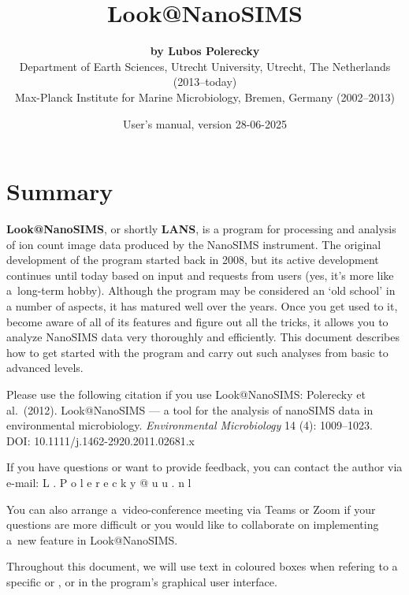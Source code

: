 \documentclass[a4paper, 11pt]{article}
\title{\LARGE \bf Look@NanoSIMS}
\author{{\large\bf by Lubos Polerecky}\\[6mm]
{\small Department of Earth Sciences, Utrecht University, Utrecht, The Netherlands (2013--today)} \\%
{\small Max-Planck Institute for Marine Microbiology, Bremen, Germany (2002--2013)}\\[3mm]}
\date{User's manual, version 28-06-2025}
\newcommand{\ttt}[1]{\textsf{#1}}
\begin{document}
\maketitle
\reversemarginpar 

\section*{Summary}
\textbf{Look@NanoSIMS}, or shortly \textbf{LANS}, is a program for processing and analysis of ion count image data produced by the NanoSIMS instrument. The original development of the program started back in 2008, but its active development continues until today based on input and requests from users (yes, it's more like a~long-term hobby). Although the program may be considered an `old school' in a number of aspects, it has matured well over the years. Once you get used to it, become aware of all of its features and figure out all the tricks, it allows you to analyze NanoSIMS data very thoroughly and efficiently. This document describes how to get started with the program and carry out such analyses from basic to advanced levels. 

\vskip6mm

Please use the following citation if you use Look@NanoSIMS:
\vskip2mm
\textsf{Polerecky et al.~(2012). Look@NanoSIMS --- a tool for the analysis of nanoSIMS data in environmental microbiology. \textit{Environmental Microbiology} 14 (4): 1009--1023.\\
DOI: 10.1111/j.1462-2920.2011.02681.x}
\tcbe

\vskip4mm

If you have questions or want to provide feedback, you can contact the author via e-mail: 
\vskip2mm
\hspace{0.5cm} \ttt{L . P o l e r e c k y @ u u . n l}

\vskip1mm\noindent You can also arrange a~video-conference meeting via Teams or Zoom if your questions are more difficult or you would like to collaborate on implementing a~new feature in Look@NanoSIMS.
\tcbe

\vskip4mm

Throughout this document, we will use text in coloured boxes when refering to a specific  or ,  or  in the program's graphical user interface.
\tcbe

\newpage

\tableofcontents
\end{document}
